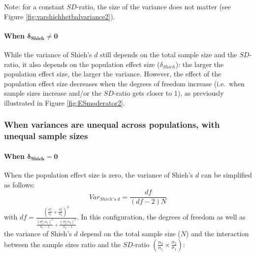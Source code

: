 \documentclass[
  english,
  man,mask]{apa6}
\let\oldparagraph\paragraph
\renewcommand{\paragraph}[1]{\oldparagraph{#1}\mbox{}}
\begin{document}
Note: for a constant \(SD\)-ratio, the size of the variance does not matter (see Figure \ref{fig:varshiehhetbalvariance2}).

\hypertarget{when-bmdelta_shieh-neq-0-1}{%
\paragraph{\texorpdfstring{When \(\bm{\delta_{Shieh} \neq 0}\)}{When \textbackslash bm\{\textbackslash delta\_\{Shieh\} \textbackslash neq 0\}}}\label{when-bmdelta_shieh-neq-0-1}}

While the variance of Shieh's \(d\) still depends on the total sample size and the \(SD\)-ratio, it also depends on the population effect size (\(\delta_{Shieh}\)): the larger the population effect size, the larger the variance. However, the effect of the population effect size decreases when the degrees of freedom increase (i.e.~when sample sizes increase and/or the \(SD\)-ratio gets closer to 1), as previously illustrated in Figure \ref{fig:ESmoderator2}.

\hypertarget{when-variances-are-unequal-across-populations-with-unequal-sample-sizes-2}{%
\subsubsection{When variances are unequal across populations, with unequal sample sizes}\label{when-variances-are-unequal-across-populations-with-unequal-sample-sizes-2}}

\hypertarget{when-bmdelta_shieh-0-2}{%
\paragraph{\texorpdfstring{When \(\bm{\delta_{Shieh} = 0}\)}{When \textbackslash bm\{\textbackslash delta\_\{Shieh\} = 0\}}}\label{when-bmdelta_shieh-0-2}}

When the population effect size is zero, the variance of Shieh's \(d\) can be simplified as follows:
\[Var_{Shieh's \; d} = \frac{df}{(df-2)N}\]
with \(df = \frac{\left(\frac{\sigma^2_1}{n_1}+\frac{\sigma^2_2}{n_2} \right)^2}{\frac{(\sigma^2_1/n_1)^2}{n_1-1}+\frac{(\sigma^2_2/n_2)^2}{n_2-1}}\). In this configuration, the degrees of freedom as well as the variance of Shieh's \(d\) depend on the total sample size (\(N\)) and the interaction between the sample sizes ratio and the \(SD\)-ratio \(\left(\frac{n_2}{n_1}\times\frac{\sigma_2}{\sigma_1} \right)\):
\end{document}
